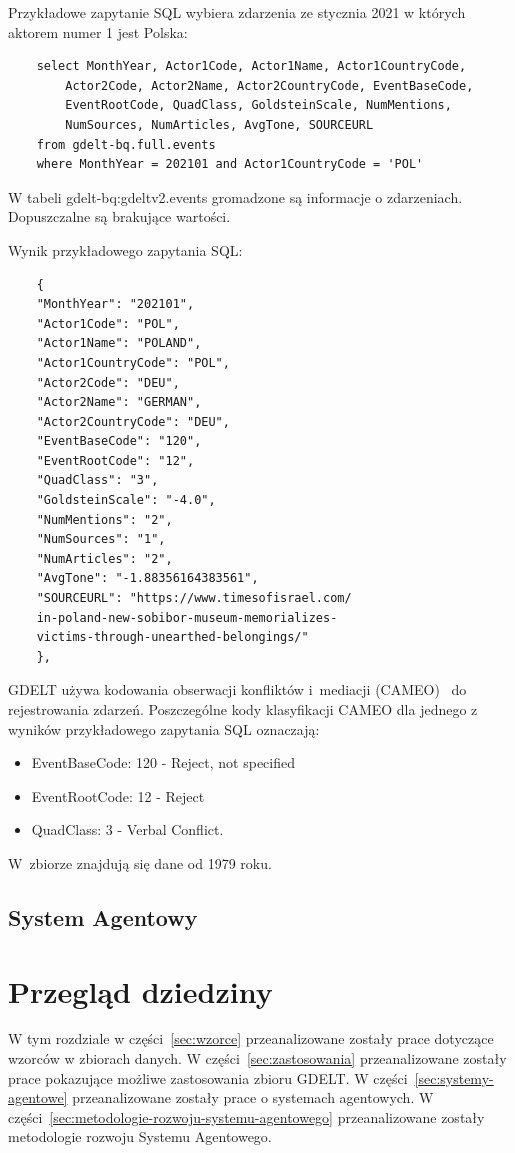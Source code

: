 \documentclass[11pt]{report}
\begin{document}
    Przykładowe zapytanie SQL wybiera zdarzenia ze stycznia 2021 w których aktorem numer 1 jest Polska:

    \begin{verbatim}
    select MonthYear, Actor1Code, Actor1Name, Actor1CountryCode,
        Actor2Code, Actor2Name, Actor2CountryCode, EventBaseCode,
        EventRootCode, QuadClass, GoldsteinScale, NumMentions,
        NumSources, NumArticles, AvgTone, SOURCEURL
    from gdelt-bq.full.events
    where MonthYear = 202101 and Actor1CountryCode = 'POL'
    \end{verbatim}

    W tabeli gdelt-bq:gdeltv2.events gromadzone są informacje o zdarzeniach.
    Dopuszczalne są brakujące wartości.

    Wynik przykładowego zapytania SQL:~\begin{verbatim}
    {
    "MonthYear": "202101",
    "Actor1Code": "POL",
    "Actor1Name": "POLAND",
    "Actor1CountryCode": "POL",
    "Actor2Code": "DEU",
    "Actor2Name": "GERMAN",
    "Actor2CountryCode": "DEU",
    "EventBaseCode": "120",
    "EventRootCode": "12",
    "QuadClass": "3",
    "GoldsteinScale": "-4.0",
    "NumMentions": "2",
    "NumSources": "1",
    "NumArticles": "2",
    "AvgTone": "-1.88356164383561",
    "SOURCEURL": "https://www.timesofisrael.com/
    in-poland-new-sobibor-museum-memorializes-
    victims-through-unearthed-belongings/"
    },
    \end{verbatim}

    GDELT używa kodowania obserwacji konfliktów i~mediacji (CAMEO)~\cite{GDELTDocumentation} do rejestrowania zdarzeń.
    Poszczególne kody klasyfikacji CAMEO dla jednego z wyników przykładowego zapytania SQL oznaczają:
    \begin{itemize}
        \item EventBaseCode: 120 - Reject, not specified
        \item EventRootCode: 12 - Reject
        \item QuadClass: 3 - Verbal Conflict.
    \end{itemize}

    W~zbiorze znajdują się dane od 1979 roku.


    \section{System Agentowy}


    \chapter{Przegląd dziedziny}\label{ch:przegląd-dziedziny}
    W tym rozdziale w części~\ref{sec:wzorce} przeanalizowane zostały prace dotyczące wzorców w zbiorach danych.
    W części~\ref{sec:zastosowania} przeanalizowane zostały prace pokazujące możliwe zastosowania zbioru GDELT\@.
    W części~\ref{sec:systemy-agentowe} przeanalizowane zostały prace o systemach agentowych.
    W części~\ref{sec:metodologie-rozwoju-systemu-agentowego} przeanalizowane zostały metodologie rozwoju Systemu Agentowego.
\end{document}
